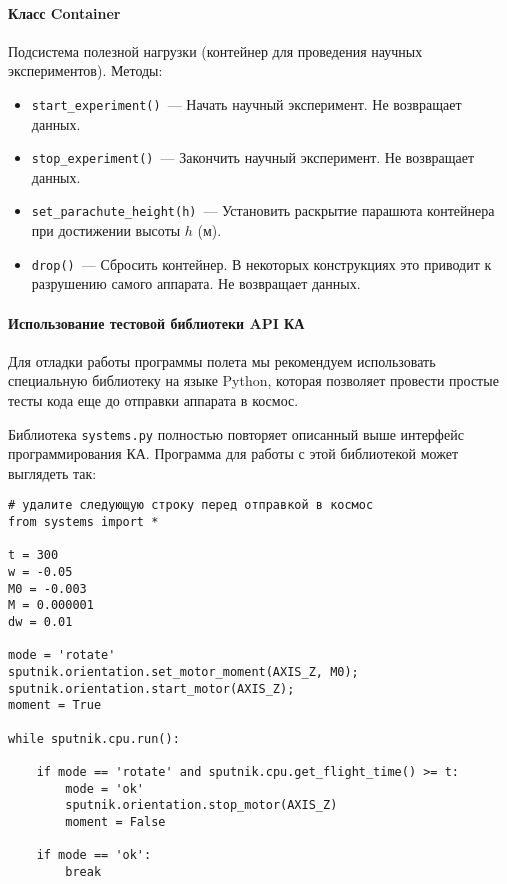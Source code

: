 \documentclass[12pt,a4paper]{article}
\begin{document}
\paragraph{Класс Container}

Подсистема полезной нагрузки (контейнер для проведения научных экспериментов). Методы:

\begin{itemize}
\item \verb'start_experiment()'~--- Начать научный эксперимент. Не возвращает данных.
\item \verb'stop_experiment()'~--- Закончить научный эксперимент. Не возвращает данных.
\item \verb'set_parachute_height(h)'~--- Установить раскрытие парашюта контейнера при
  достижении высоты $h$ (м).
\item \verb'drop()'~--- Сбросить контейнер. В некоторых конструкциях это приводит к
  разрушению самого аппарата. Не возвращает данных.
\end{itemize}

\paragraph{Использование тестовой библиотеки API КА}

Для отладки работы программы полета мы рекомендуем использовать специальную библиотеку на
языке Python, которая позволяет провести простые тесты кода еще до отправки аппарата в
космос.

Библиотека \verb'systems.py' полностью повторяет описанный выше интерфейс программирования
КА. Программа для работы с этой библиотекой может выглядеть так:

\begin{verbatim}
# удалите следующую строку перед отправкой в космос
from systems import *

t = 300
w = -0.05
M0 = -0.003
M = 0.000001
dw = 0.01

mode = 'rotate'
sputnik.orientation.set_motor_moment(AXIS_Z, M0);
sputnik.orientation.start_motor(AXIS_Z);
moment = True

while sputnik.cpu.run():

    if mode == 'rotate' and sputnik.cpu.get_flight_time() >= t: 
        mode = 'ok'
        sputnik.orientation.stop_motor(AXIS_Z)
        moment = False

    if mode == 'ok':
        break
\end{verbatim}
               
\end{document}
